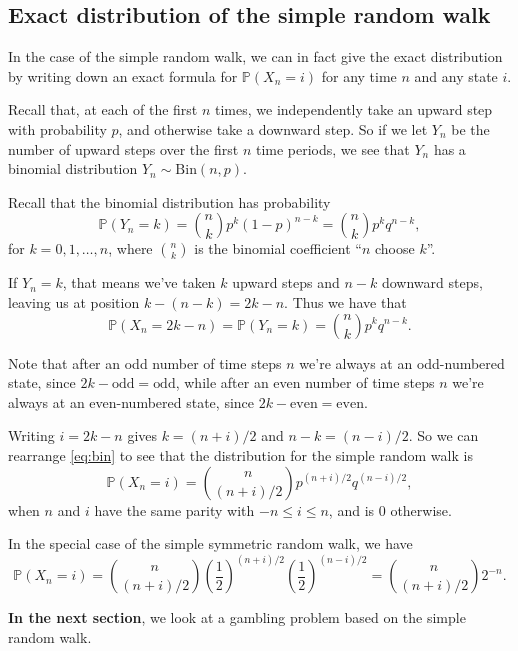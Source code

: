 \documentclass[
  a4paper,
]{article}
\theoremstyle{definition}
\theoremstyle{definition}
\theoremstyle{definition}
\theoremstyle{remark}
\begin{document}
\hypertarget{exact-distribution}{%
\subsection{Exact distribution of the simple random walk}\label{exact-distribution}}

In the case of the simple random walk, we can in fact give the exact distribution by writing down an exact formula for \(\mathbb P(X_n = i)\) for any time \(n\) and any state \(i\).

Recall that, at each of the first \(n\) times, we independently take an upward step with probability \(p\), and otherwise take a downward step. So if we let \(Y_n\) be the number of upward steps over the first \(n\) time periods, we see that \(Y_n\) has a binomial distribution \(Y_n \sim \text{Bin}(n,p)\).

Recall that the binomial distribution has probability
\[  \mathbb P(Y_n = k)  = \binom nk p^k (1-p)^{n-k} = \binom nk p^k q^{n-k} , \]
for \(k = 0,1,\dots, n\), where \(\binom{n}{k}\) is the binomial coefficient ``\(n\) choose \(k\)''.

If \(Y_n = k\), that means we've taken \(k\) upward steps and \(n-k\) downward steps, leaving us at position \(k - (n-k) = 2k - n\). Thus we have that
\begin{equation}
  \mathbb P(X_n = 2k - n) = \mathbb P(Y_n = k) = \binom nk p^k q^{n-k} .  \label{eq:bin}
  \end{equation}

Note that after an odd number of time steps \(n\) we're always at an odd-numbered state, since \(2k - \text{odd} = \text{odd}\), while after an even number of time steps \(n\) we're always at an even-numbered state, since \(2k - \text{even} = \text{even}\).

Writing \(i = 2k - n\) gives \(k = (n+i)/2\) and \(n-k = (n-i)/2\). So we can rearrange \eqref{eq:bin} to see that the distribution for the simple random walk is
\[ \mathbb P(X_n = i) =  \binom{n}{(n+i)/2} p^{(n+i)/2} q^{(n-i)/2} , \]
when \(n\) and \(i\) have the same parity with \(-n \leq i \leq n\), and is \(0\) otherwise.

In the special case of the simple symmetric random walk, we have
\[ \mathbb P(X_n = i) = \binom{n}{(n+i)/2} \left(\frac12\right)^{(n+i)/2} \left(\frac12\right)^{(n-i)/2} = \binom{n}{(n+i)/2} 2^{-n} . \]

\textbf{In the next section}, we look at a gambling problem based on the simple random walk.
\end{document}
